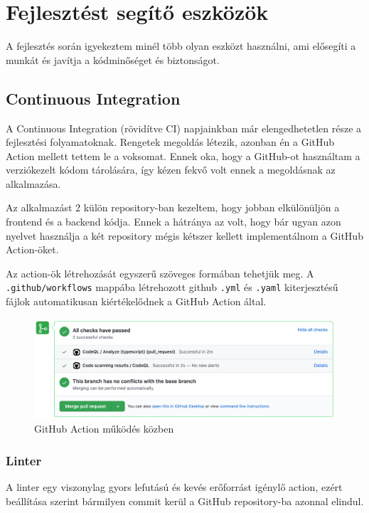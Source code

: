 \chapter{Fejlesztést segítő eszközök}
A fejlesztés során igyekeztem minél több olyan eszközt használni, ami elősegíti a munkát és javítja a kódminőséget és biztonságot.

\section{Continuous Integration}
A Continuous Integration (rövidítve CI) napjainkban már elengedhetetlen része a fejlesztési folyamatoknak.
Rengetek megoldás létezik, azonban én a GitHub Action mellett tettem le a voksomat.
Ennek oka, hogy a GitHub-ot használtam a verziókezelt kódom tárolására, így kézen fekvő volt ennek a megoldásnak az alkalmazása.

Az alkalmazást 2 külön repository-ban kezeltem, hogy jobban elkülönüljön a frontend és a backend kódja.
Ennek a hátránya az volt, hogy bár ugyan azon nyelvet használja a két repository mégis kétszer kellett implementálnom a GitHub Action-öket.

Az action-ök létrehozását egyszerű szöveges formában tehetjük meg. 
A \lstinline|.github/workflows| mappába létrehozott github \lstinline|.yml| és \lstinline|.yaml| kiterjesztésű fájlok automatikusan kiértékelődnek a GitHub Action által.

\begin{figure}[!ht]
  \centering
  \includegraphics[width=150mm, keepaspectratio]{figures/ci.png}
  \caption{GitHub Action működés közben}
  \label{fig:GitHubAction}
\end{figure}

\subsection{Linter}
A linter egy viszonylag gyors lefutású és kevés erőforrást igénylő action, ezért beállítása szerint bármilyen commit kerül a GitHub repository-ba azonnal elindul.



